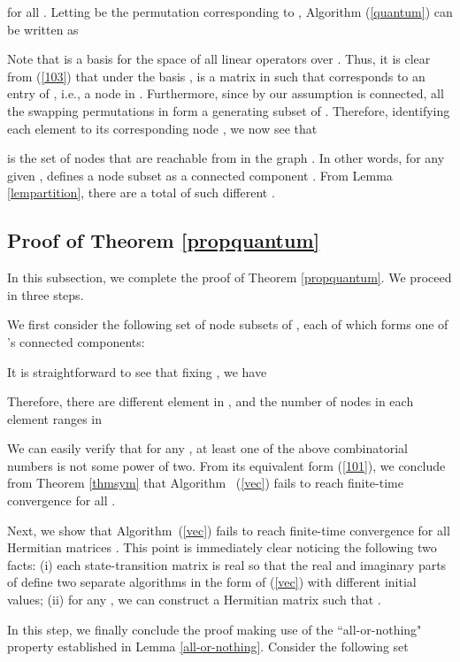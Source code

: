 \documentclass[a4paper, 11pt]{article}
\begin{document}
for all . {Letting  be the permutation corresponding to ,} Algorithm (\ref{quantum}) can be written as



Note that  is a basis for the space of all linear operators over . Thus, it is clear from (\ref{103}) that under the basis ,    is a matrix in   such that  corresponds to an entry of , i.e., a node in . Furthermore,  since by our assumption  is connected, all the swapping permutations in  form a generating subset of . Therefore, identifying each element  to its corresponding node , we now see that

is the set of nodes that are reachable from  in the graph . In other words, for any given ,  defines a node subset as a connected component . From Lemma \ref{lempartition}, there are a total of  such different .
\subsection{Proof of Theorem \ref{propquantum}}
In this subsection, we complete the proof of Theorem \ref{propquantum}. We proceed in {three} steps.


 We first consider the following set of node subsets of ,  each of which forms one of  's connected components:

It is straightforward to see that fixing , we have

Therefore, there are  different element in , and the number of nodes in each element ranges in

We can easily verify that for any ,  at least one of the above combinatorial numbers is not some power of two. From its equivalent form (\ref{101}), we conclude from Theorem \ref{thmsym} that Algorithm~ (\ref{vec}) fails to reach finite-time convergence for all .

 Next, we show that  Algorithm~(\ref{vec}) fails to reach finite-time convergence for all Hermitian matrices . This point is immediately  clear noticing the following two facts: (i) each state-transition matrix  is real so that the real and imaginary parts of  define two separate  algorithms in the form of (\ref{vec}) with different initial values; (ii) for any , we can construct a Hermitian matrix  such that .

 In this step, we finally conclude the proof making use of the ``all-or-nothing" property established in Lemma \ref{all-or-nothing}. Consider the following set
\end{document}
